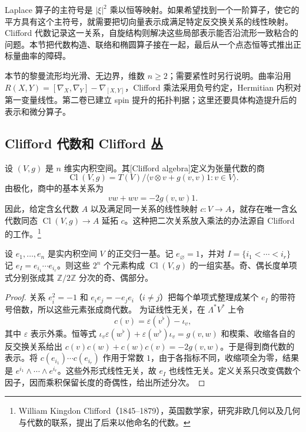 
% 
% 


Laplace 算子的主符号是 \(|\xi|^2\) 乘以恒等映射。如果希望找到一个一阶算子，使它的平方具有这个主符号，就需要把切向量表示成满足特定反交换关系的线性映射。Clifford 代数记录这一关系，自旋结构则解决这些局部表示能否沿流形一致粘合的问题。本节把代数构造、联络和椭圆算子接在一起，最后从一个点态恒等式推出正标量曲率的障碍。

\ProseParagraphBreak

本节的黎曼流形均光滑、无边界，维数 \(n\ge2\)；需要紧性时另行说明。曲率沿用
\(R(X,Y)=[\nabla_X,\nabla_Y]-\nabla_{[X,Y]}\)，Clifford 乘法采用负号约定，Hermitian 内积对第一变量线性。第二卷已建立 spin 提升的拓扑判据；这里还要具体构造提升后的表示和微分算子。

\subsection{Clifford 代数和 Clifford 丛}
\label{g3:subsec:1703:01}
设 \((V,g)\) 是 \(n\) 维实内积空间。其[Clifford algebra]定义为张量代数的商
\[
	\operatorname{Cl}(V,g)=T(V)\big/\langle v\otimes v+g(v,v)1:v\in V\rangle.
\]
由极化，商中的基本关系为
\begin{equation}\label{g3:eq:clifford-negative-relation}
	vw+wv=-2g(v,w)1.
\end{equation}
因此，给定含幺代数 \(A\) 以及满足同一关系的线性映射 \(c:V\to A\)，就存在唯一含幺代数同态 \(\operatorname{Cl}(V,g)\to A\) 延拓 \(c\)。这种把二次关系放入乘法的办法源自 Clifford 的工作。\footnote{William Kingdon Clifford（1845--1879），英国数学家，研究非欧几何以及几何与代数的联系，提出了后来以他命名的代数。}

\begin{proposition}\label{g3:prop:clifford-basis}
	设 \(e_1,\ldots,e_n\) 是实内积空间 \(V\) 的正交归一基。记 \(e_\varnothing=1\)，并对 \(I=\{i_1<\cdots<i_r\}\) 记 \(e_I=e_{i_1}\cdots e_{i_r}\)。则这些 \(2^n\) 个元素构成 \(\operatorname{Cl}(V,g)\) 的一组实基。奇、偶长度单项式分别张成其 \(\mathbb Z/2\mathbb Z\) 分次的奇、偶部分。
\end{proposition}
\begin{proof}
	关系 \(e_i^2=-1\) 和 \(e_ie_j=-e_je_i\)（\(i\ne j\)）把每个单项式整理成某个 \(e_I\) 的带符号倍数，所以这些元素张成商代数。
	为证线性无关，在 \(\Lambda^*V^*\) 上令
	\[
		c(v)=\varepsilon(v^\flat)-\iota_v,
	\]
	其中 \(\varepsilon\) 表示外乘。恒等式
	\(\iota_v\varepsilon(w^\flat)+\varepsilon(w^\flat)\iota_v=g(v,w)\)
	和楔乘、收缩各自的反交换关系给出
	\(c(v)c(w)+c(w)c(v)=-2g(v,w)\)。于是得到商代数的表示。将 \(c(e_{i_1})\cdots c(e_{i_r})\) 作用于常数 \(1\)，由于各指标不同，收缩项全为零，结果是 \(e^{i_1}\wedge\cdots\wedge e^{i_r}\)。这些外形式线性无关，故 \(e_I\) 也线性无关。定义关系只改变偶数个因子，因而乘积保留长度的奇偶性，给出所述分次。
\end{proof}

